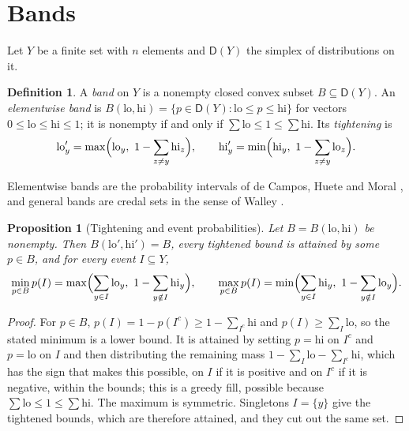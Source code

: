 \documentclass[11pt]{article}
\newtheorem{proposition}[theorem]{Proposition}
\theoremstyle{definition}
\newtheorem{definition}[theorem]{Definition}
\theoremstyle{remark}
\newcommand{\D}{\mathsf{D}}
\begin{document}
\section{Bands}\label{sec:bands}

Let $Y$ be a finite set with $n$ elements and $\D(Y)$ the simplex of distributions on it.

\begin{definition}\label{def:band}
A \emph{band} on $Y$ is a nonempty closed convex subset $B\subseteq\D(Y)$. An \emph{elementwise band} is
$B(\mathrm{lo},\mathrm{hi})=\{p\in\D(Y):\mathrm{lo}\le p\le\mathrm{hi}\}$ for vectors $0\le\mathrm{lo}\le\mathrm{hi}\le1$; it is
nonempty if and only if $\sum\mathrm{lo}\le1\le\sum\mathrm{hi}$. Its \emph{tightening} is
\[
\mathrm{lo}'_y=\max\Bigl(\mathrm{lo}_y,\ 1-\sum_{z\ne y}\mathrm{hi}_z\Bigr),\qquad
\mathrm{hi}'_y=\min\Bigl(\mathrm{hi}_y,\ 1-\sum_{z\ne y}\mathrm{lo}_z\Bigr).
\]
\end{definition}

Elementwise bands are the probability intervals of de Campos, Huete and Moral \cite{deCampos1994}, and general bands are
credal sets in the sense of Walley \cite{Walley1991}.

\begin{proposition}[Tightening and event probabilities]\label{prop:tighten}
Let $B=B(\mathrm{lo},\mathrm{hi})$ be nonempty. Then $B(\mathrm{lo}',\mathrm{hi}')=B$, every tightened bound is attained by
some $p\in B$, and for every event $I\subseteq Y$,
\[
\min_{p\in B}p(I)=\max\Bigl(\sum_{y\in I}\mathrm{lo}_y,\ 1-\sum_{y\notin I}\mathrm{hi}_y\Bigr),\qquad
\max_{p\in B}p(I)=\min\Bigl(\sum_{y\in I}\mathrm{hi}_y,\ 1-\sum_{y\notin I}\mathrm{lo}_y\Bigr).
\]
\end{proposition}
\begin{proof}
For $p\in B$, $p(I)=1-p(I^c)\ge1-\sum_{I^c}\mathrm{hi}$ and $p(I)\ge\sum_I\mathrm{lo}$, so the stated minimum is a lower bound. It
is attained by setting $p=\mathrm{hi}$ on $I^c$ and $p=\mathrm{lo}$ on $I$ and then distributing the remaining mass
$1-\sum_I\mathrm{lo}-\sum_{I^c}\mathrm{hi}$, which has the sign that makes this possible, on $I$ if it is positive and on
$I^c$ if it is negative, within the bounds; this is a greedy fill, possible because $\sum\mathrm{lo}\le1\le\sum\mathrm{hi}$. The
maximum is symmetric. Singletons $I=\{y\}$ give the tightened bounds, which are therefore attained, and they cut out the same
set.
\end{proof}
\end{document}
